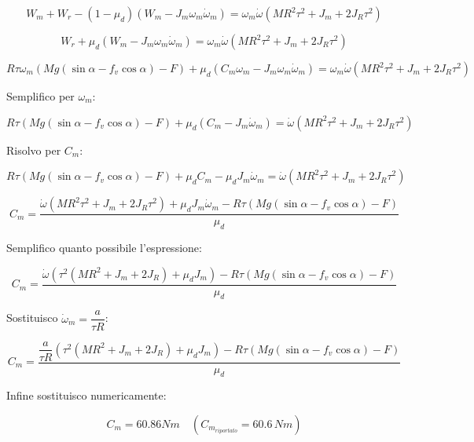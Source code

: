 \documentclass[main.tex]{subfiles}
\begin{document}
\[
	W_m + W_r - (1-\mu_d)(W_m - J_m\omega_m\dot{\omega}_m) = \omega_m\dot{\omega}(MR^2\tau^2 + J_m + 2J_R\tau^2)
\]

\[
	W_r +\mu_d(W_m - J_m\omega_m\dot{\omega}_m) = \omega_m\dot{\omega}(MR^2\tau^2 + J_m + 2J_R\tau^2)
\]

\[
	R\tau\omega_m(Mg(\sin\alpha - f_v\cos\alpha) - F) +\mu_d(C_m\omega_m - J_m\omega_m\dot{\omega}_m) = \omega_m\dot{\omega}(MR^2\tau^2 + J_m + 2J_R\tau^2)
\]

Semplifico per $\omega_m$:

\[
	R\tau(Mg(\sin\alpha - f_v\cos\alpha) - F) +\mu_d(C_m - J_m\dot{\omega}_m) = \dot{\omega}(MR^2\tau^2 + J_m + 2J_R\tau^2)
\]

Risolvo per $C_m$:

\[
	R\tau(Mg(\sin\alpha - f_v\cos\alpha) - F) +\mu_dC_m - \mu_dJ_m\dot{\omega}_m = \dot{\omega}(MR^2\tau^2 + J_m + 2J_R\tau^2)
\]

\[
	C_m = \frac{\dot{\omega}(MR^2\tau^2 + J_m + 2J_R\tau^2) + \mu_dJ_m\dot{\omega}_m - R\tau(Mg(\sin\alpha - f_v\cos\alpha) - F)}{\mu_d}
\]

Semplifico quanto possibile l'espressione:

\[
	C_m = \frac{\dot{\omega}(\tau^2 (MR^2+ J_m + 2J_R) + \mu_dJ_m) - R\tau(Mg(\sin\alpha - f_v\cos\alpha) - F)}{\mu_d}
\]

Sostituisco $\dot{\omega}_m =\dfrac{a}{\tau R}$:

\[
	C_m = \frac{\dfrac{a}{\tau R}(\tau^2 (MR^2+ J_m + 2J_R) + \mu_dJ_m) - R\tau(Mg(\sin\alpha - f_v\cos\alpha) - F)}{\mu_d}
\]

Infine sostituisco numericamente:

\[
	C_m = 60.86 Nm \quad (C_{m_{riportato}} = 60.6\,Nm)
\]
\end{document}
